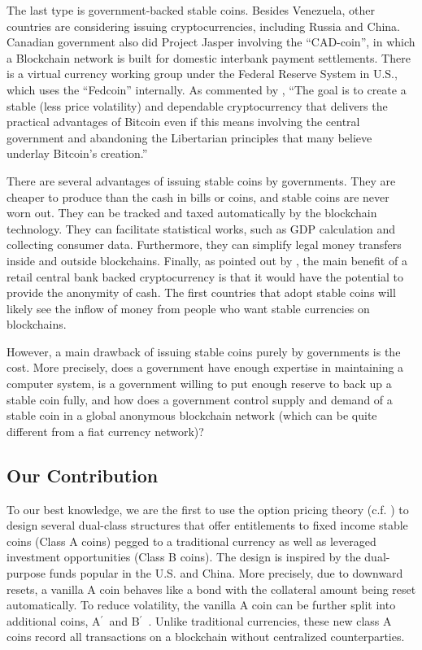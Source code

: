 \documentclass[draft, noinfoline]{ectaart}
\numberwithin{equation}{section}
\theoremstyle{plain}
\newcommand{\Ap}{A\ensuremath{^\prime}~}
\newcommand{\Bp}{B\ensuremath{^\prime}~}
\begin{document}
The last type is government-backed stable coins. Besides Venezuela, other countries are considering issuing cryptocurrencies, including Russia and China. Canadian government also did Project Jasper involving the ``CAD-coin'', in which a Blockchain network is built for domestic interbank payment settlements. There is a virtual currency working group under the Federal Reserve System in U.S., which uses the ``Fedcoin'' internally. As commented by \cite{garratt_cad-coin_2016}, ``The goal is to create a stable (less price volatility) and dependable cryptocurrency that delivers the practical advantages of Bitcoin even if this means involving the central government and abandoning the Libertarian principles that many believe underlay Bitcoin's creation.''

There are several advantages of issuing stable coins by governments. They are cheaper to produce than the cash in bills or coins, and stable coins are never worn out. They can be tracked and taxed automatically by the blockchain technology. They can facilitate statistical works, such as GDP calculation and collecting consumer data. Furthermore, they can simplify legal money transfers inside and outside blockchains. Finally, as pointed out by \cite{bech_central_2017}, the main benefit of a retail central bank backed cryptocurrency is that it would have the potential to provide the anonymity of cash. The first countries that adopt stable coins will likely see the inflow of money from people who want stable currencies on blockchains.

However, a main drawback of issuing stable coins purely by governments is the cost. More precisely, does a government have enough expertise in maintaining a computer system, is a government willing to put enough reserve to back up a stable coin fully, and  how does a government control supply and demand of a stable coin in a global anonymous blockchain network (which can be quite different from a fiat currency network)?



\subsection{Our Contribution}

To our best knowledge, we are the first to use the option pricing theory (c.f. \cite{duffie_dynamic_2010,hull_options_2017,ingersoll_theory_1987,jarrow_derivative_1999,shreve_stochastic_2004}) to design several dual-class structures that offer entitlements to fixed income stable coins (Class A coins) pegged to a traditional currency as well as leveraged investment opportunities (Class B coins).  The design is inspired by the dual-purpose funds popular in the U.S. and China. More precisely, due to downward resets, a vanilla A coin behaves like a bond with the collateral amount being reset automatically. To reduce volatility, the vanilla A coin can be further split into additional coins, \Ap and \Bp. Unlike traditional currencies, these new class A coins record all transactions on a blockchain without centralized counterparties.
\end{document}
